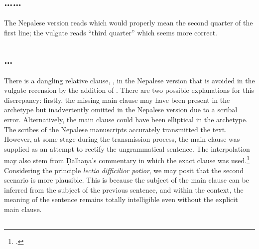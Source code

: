 \subsection{\ldots{}\ldots}\label{yogan1}
	
The Nepalese version reads  which would
properly mean the second quarter of the first line; the vulgate reads
 “third quarter” which seems more correct.

\subsection{\ldots{}}		

There is a dangling relative clause,
, in the Nepalese version that is avoided in the vulgate
recension by the addition of . 
There are two possible explanations for this discrepancy: 
firstly, the missing main clause may have been present in the archetype 
but inadvertently omitted in the Nepalese version due to a scribal error. 
Alternatively, the main clause could have been elliptical in the archetype. 
The scribes of the Nepalese manuscripts accurately transmitted the text. 
However, at some stage during the transmission process, 
the main clause was supplied as an attempt to rectify the ungrammatical sentence.
The interpolation may also stem from Ḍalhaṇa's commentary in which the exact clause was used.\footnote{
 .}
Considering the principle \emph{lectio difficilior potior}, 
we may posit that the second scenario is more plausible. 
This is because the subject of the main clause can be inferred from 
the subject of the previous sentence, and within the context, 
the meaning of the sentence remains totally intelligible even without the explicit main clause.
	
\subsection{}
	
